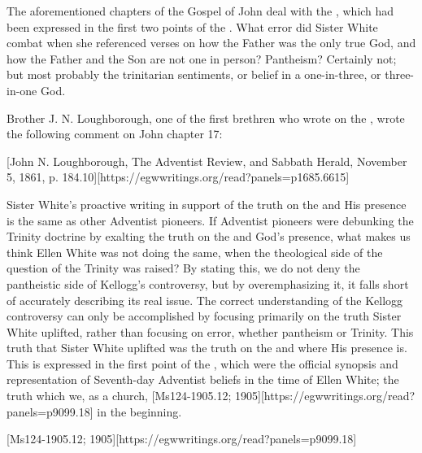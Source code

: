 The aforementioned chapters of the Gospel of John deal with the , which had been expressed in the first two points of the . What error did Sister White combat when she referenced verses on how the Father was the only true God, and how the Father and the Son are not one in person? Pantheism? Certainly not; but most probably the trinitarian sentiments, or belief in a one-in-three, or three-in-one God.

Brother J. N. Loughborough, one of the first brethren who wrote on the , wrote the following comment on John chapter 17:

[John N. Loughborough, The Adventist Review, and Sabbath Herald, November 5, 1861, p. 184.10][https://egwwritings.org/read?panels=p1685.6615]

Sister White’s proactive writing in support of the truth on the  and His presence is the same as other Adventist pioneers. If Adventist pioneers were debunking the Trinity doctrine by exalting the truth on the  and God’s presence, what makes us think Ellen White was not doing the same, when the theological side of the question of the Trinity was raised? By stating this, we do not deny the pantheistic side of Kellogg’s controversy, but by overemphasizing it, it falls short of accurately describing its real issue. The correct understanding of the Kellogg controversy can only be accomplished by focusing primarily on the truth Sister White uplifted, rather than focusing on error, whether pantheism or Trinity. This truth that Sister White uplifted was the truth on the  and where His presence is. This is expressed in the first point of the , which were the official synopsis and representation of Seventh-day Adventist beliefs in the time of Ellen White; the truth which we, as a church, [Ms124-1905.12; 1905][https://egwwritings.org/read?panels=p9099.18] in the beginning.

[Ms124-1905.12; 1905][https://egwwritings.org/read?panels=p9099.18]

